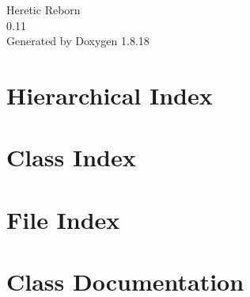 \let\mypdfximage\pdfximage\def\pdfximage{\immediate\mypdfximage}\documentclass[twoside]{book}
\newcommand{\+}{\discretionary{\mbox{\scriptsize$\hookleftarrow$}}{}{}}
\newcommand{\clearemptydoublepage}{%
  \newpage{\pagestyle{empty}\cleardoublepage}%
}
\begin{document}
\hypersetup{pageanchor=false,
             bookmarksnumbered=true,
             pdfencoding=unicode
            }
\begin{titlepage}
\vspace*{7cm}
\begin{center}%
{\Large Heretic Reborn \\[1ex]\large 0.\+11 }\\
\vspace*{1cm}
{\large Generated by Doxygen 1.8.18}\\
\end{center}
\end{titlepage}
\clearemptydoublepage
{}
\tableofcontents
\clearemptydoublepage
{}
\hypersetup{pageanchor=true}

\chapter{Hierarchical Index}

\chapter{Class Index}

\chapter{File Index}

\chapter{Class Documentation}













































\end{document}
